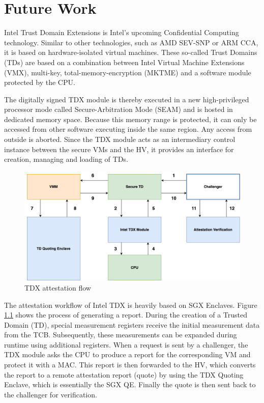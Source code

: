 
\chapter{Future Work}\label{chapter:future_work}

Intel Trust Domain Extensions is Intel's upcoming Confidential Computing technology.
Similar to other technologies, such as AMD SEV-SNP or ARM CCA, it is based on hardware-isolated virtual machines. These so-called Trust Domains (TDs) are based on a combination between Intel Virtual Machine Extensions (VMX), multi-key, total-memory-encryption (MKTME) and a software module protected by the CPU. \parencite{tdx_paper} 

The digitally signed TDX module is thereby executed in a new high-privileged processor mode called Secure-Arbitration Mode (SEAM) and is hosted in dedicated memory space.
Because this memory range is protected, it can only be accessed from other software executing inside the same region. Any access from outside is aborted. 
Since the TDX module acts as an intermediary control instance between the secure VMs and the HV, it provides an interface for creation, managing and loading of TDs.

\begin{figure}
	\begin{center} 
		\includegraphics[width=1.0\linewidth]{figures/tdx.drawio.png}
	\end{center}
	\caption{TDX attestation flow \cite{tdx_paper}} 
	\label{tdx-attesation}
\end{figure}

The attestation workflow of Intel TDX is heavily based on SGX Enclaves. Figure \ref{tdx-attesation} shows the process of generating a report. During the creation of a Trusted Domain (TD), special measurement registers receive the initial measurement data from the TCB. Subsequently, these measurements can be expanded during runtime using additional registers. When a request is sent by a challenger, the TDX module asks the CPU to produce a report for the corresponding VM and protect it with a MAC.
This report is then forwarded to the HV, which converts the report to a remote attestation report (quote) by using the TDX Quoting Enclave, which is essentially the SGX QE. Finally the quote is then sent back to the challenger for verification. \cite{TDX_comparison_quartet}

